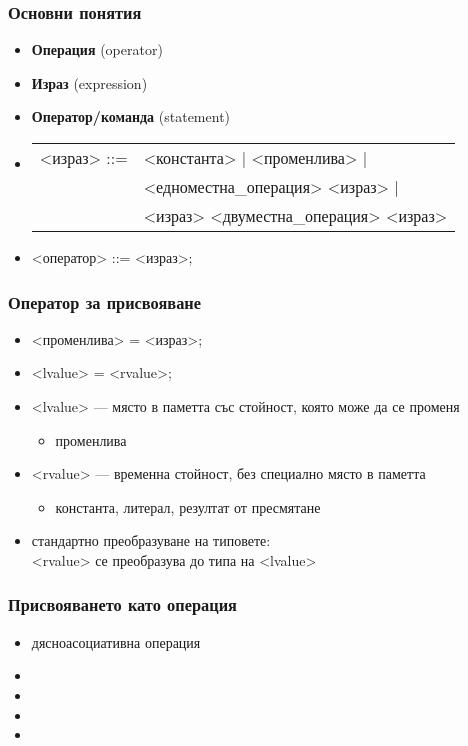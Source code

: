 \documentclass{beamer}
\begin{document}
\begin{frame}
  \frametitle{Основни понятия}

  \begin{itemize}
  \item \textbf{Операция} (operator)
  \item \textbf{Израз} (expression)
  \item \textbf{Оператор/команда} (statement)
  \item{}
    \begin{tabular}[t]{@{}rl@{}}
      <израз> ::= &<константа> | <променлива> |\\
      &<едноместна\_операция> <израз> |\\
      &<израз> <двуместна\_операция> <израз>
    \end{tabular}
  \item{} <оператор> ::= <израз>\tta;
  \end{itemize}
\end{frame}

\begin{frame}
  \frametitle{Оператор за присвояване}

  \begin{itemize}[<+->]
  \item{} <променлива> \tta= <израз>\tta;
  \item{} <lvalue> \tta= <rvalue>\tta;
  \item{} <lvalue> --- място в паметта със стойност, която може да се променя
    \begin{itemize}[<.->]
    \item  \exa променлива
  \end{itemize}
  \item{} <rvalue> --- временна стойност, без специално място в паметта
    \begin{itemize}[<.->]
    \item \exa константа, литерал, резултат от пресмятане
  \end{itemize}
  \item стандартно преобразуване на типовете:\\
    <rvalue> се преобразува до типа на <lvalue>
  \end{itemize}

\end{frame}

\begin{frame}
  \frametitle{Присвояването като операция}
  \begin{fixedarea}[.6]
    \begin{itemize}
    \item<1-> \alert{дясноасоциативна} операция
    \item<2-> 
    \item<3> 
    \item<5-> \exa {}
    \item<6-> \exa {}
    \end{itemize}
  \end{fixedarea}
\end{frame}
\end{document}
